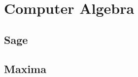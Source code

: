  
\chapter{Computer Algebra}


\section{Sage}
\label{sec:sage}


\section{Maxima}
\label{sec:maxima}


